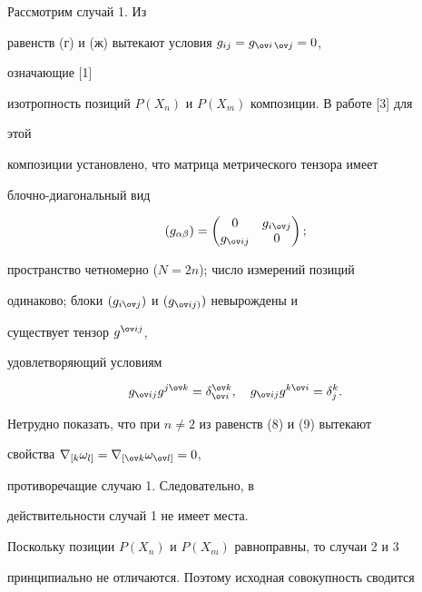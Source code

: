  


Рассмотрим случай 1. Из 


равенств (г) и (ж) вытекают условия $g_{i j}=g_{\ov i\,\ov j}=0$, 


означающие [1] 


изотропность позиций $P(X_n)$ и $P(X_m)$ композиции. В работе [3] для 


этой 


композиции установлено, что матрица метрического тензора имеет 


блочно-диагональный вид 


\begin{equation} 


(g_{\alpha\beta})= 


\begin{pmatrix} 


0 & g_{i\ov j} \\ g_{\ov i j} & 0 


\end{pmatrix} 


; 


\end{equation} 


пространство четномерно ($N=2n$); число измерений позиций 


одинаково; блоки $(g_{i \ov j})$ и $(g_{\ov i j)})$ невырождены и 


существует тензор $g^{\ov i j}$, 


удовлетворяющий условиям 


\begin{equation} 


g_{\ov i j}g^{j \ov k}=\delta^{\ov k}_{\ov i},\quad 


g_{\ov i j}g^{k\ov i}=\delta^k_j. 


\end{equation} 


Нетрудно показать, что при $n\ne2$ из равенств (8) и (9) вытекают 


свойства $\nabla_{[k}\omega_{l]}=\nabla_{[\ov k}\omega_{\ov l]}=0$, 


противоречащие случаю 1. Следовательно, в 


действительности случай 1 не имеет места. 


 


Поскольку позиции $P(X_n)$ и $P(X_m)$ равноправны, то случаи 2 и 3 


принципиально не отличаются. Поэтому исходная совокупность сводится 


